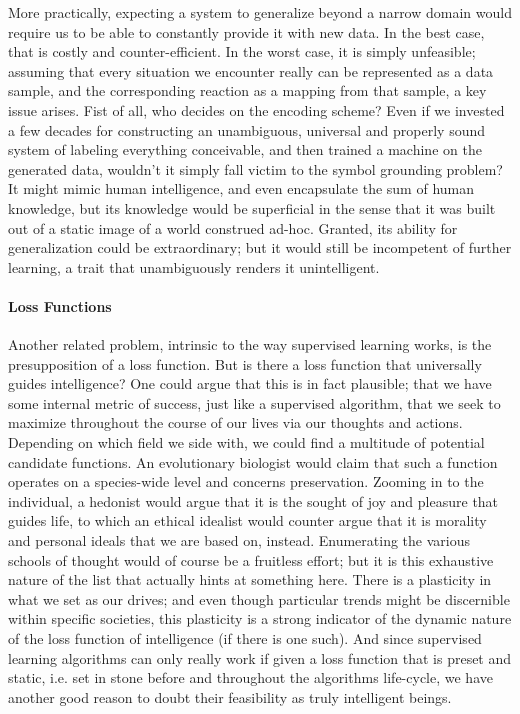 \documentclass[]{article}
\begin{document}
More practically, expecting a system to generalize beyond a narrow domain would require us to be able to constantly provide it with new data. In the best case, that is costly and counter-efficient. In the worst case, it is simply unfeasible; assuming that every situation we encounter really can be represented as a data sample, and the corresponding reaction as a mapping from that sample, a key issue arises. Fist of all, who decides on the encoding scheme? Even if we invested a few decades for constructing an unambiguous, universal and properly sound system of labeling everything conceivable, and then trained a machine on the generated data, wouldn't it simply fall victim to the symbol grounding problem? It might mimic human intelligence, and even encapsulate the sum of human knowledge, but its knowledge would be superficial in the sense that it was built out of a static image of a world construed ad-hoc. Granted, its ability for generalization could be extraordinary; but it would still be incompetent of further learning, a trait that unambiguously renders it unintelligent.

\paragraph{Loss Functions}
Another related problem, intrinsic to the way supervised learning works, is the presupposition of a loss function. But is there a loss function that universally guides intelligence? One could argue that this is in fact plausible; that we have some internal metric of success, just like a supervised algorithm, that we seek to maximize throughout the course of our lives via our thoughts and actions. Depending on which field we side with, we could find a multitude of potential candidate functions. An evolutionary biologist would claim that such a function operates on a species-wide level and concerns preservation. Zooming in to the individual, a hedonist would argue that it is the sought of joy and pleasure that guides life, to which an ethical idealist would counter argue that it is morality and personal ideals that we are based on, instead. Enumerating the various schools of thought would of course be a fruitless effort; but it is this exhaustive nature of the list that actually hints at something here. There is a plasticity in what we set as our drives; and even though particular trends might be discernible within specific societies, this plasticity is a strong indicator of the dynamic nature of the loss function of intelligence (if there is one such). And since supervised learning algorithms can only really work if given a loss function that is preset and static, i.e. set in stone before and throughout the algorithms life-cycle, we have another good reason to doubt their feasibility as truly intelligent beings.
\end{document}
